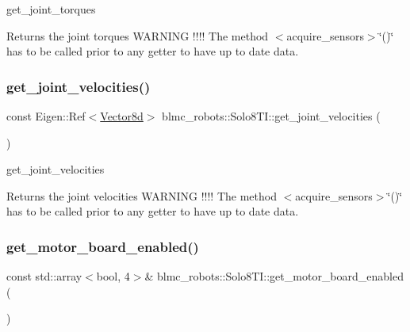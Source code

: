 get\+\_\+joint\+\_\+torques 

\begin{DoxyReturn}{Returns}
the joint torques W\+A\+R\+N\+I\+NG !!!! The method $<$acquire\+\_\+sensors$>$\char`\"{}()\char`\"{} has to be called prior to any getter to have up to date data. 
\end{DoxyReturn}
\mbox{\label{classblmc__robots_1_1Solo8TI_ae419d6776511856df3ff54e348774a97}} 
\subsubsection{\texorpdfstring{get\+\_\+joint\+\_\+velocities()}{get\_joint\_velocities()}}
{\footnotesize\ttfamily const Eigen\+::\+Ref$<$\hyperlink{common__header_8hpp_a98975ffbe0bca1296078e0350dfedd60}{Vector8d}$>$ blmc\+\_\+robots\+::\+Solo8\+T\+I\+::get\+\_\+joint\+\_\+velocities (\begin{DoxyParamCaption}{ }\end{DoxyParamCaption})\hspace{0.3cm}{\ttfamily [inline]}}



get\+\_\+joint\+\_\+velocities 

\begin{DoxyReturn}{Returns}
the joint velocities W\+A\+R\+N\+I\+NG !!!! The method $<$acquire\+\_\+sensors$>$\char`\"{}()\char`\"{} has to be called prior to any getter to have up to date data. 
\end{DoxyReturn}
\mbox{\label{classblmc__robots_1_1Solo8TI_a1c99bf64212b2b5c84f7ccfbdea5b935}} 
\subsubsection{\texorpdfstring{get\+\_\+motor\+\_\+board\+\_\+enabled()}{get\_motor\_board\_enabled()}}
{\footnotesize\ttfamily const std\+::array$<$bool, 4$>$\& blmc\+\_\+robots\+::\+Solo8\+T\+I\+::get\+\_\+motor\+\_\+board\+\_\+enabled (\begin{DoxyParamCaption}{ }\end{DoxyParamCaption})\hspace{0.3cm}{\ttfamily [inline]}}



